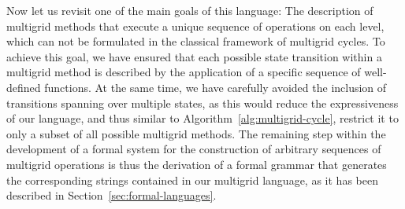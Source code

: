 Now let us revisit one of the main goals of this language: The description of multigrid methods that execute a unique sequence of operations on each level, which can not be formulated in the classical framework of multigrid cycles.
To achieve this goal, we have ensured that each possible state transition within a multigrid method is described by the application of a specific sequence of well-defined functions. 
At the same time, we have carefully avoided the inclusion of transitions spanning over multiple states, as this would reduce the expressiveness of our language, and thus similar to Algorithm~\ref{alg:multigrid-cycle}, restrict it to only a subset of all possible multigrid methods.
The remaining step within the development of a formal system for the construction of arbitrary sequences of multigrid operations is thus the derivation of a formal grammar that generates the corresponding strings contained in our multigrid language, as it has been described in Section~\ref{sec:formal-languages}.

